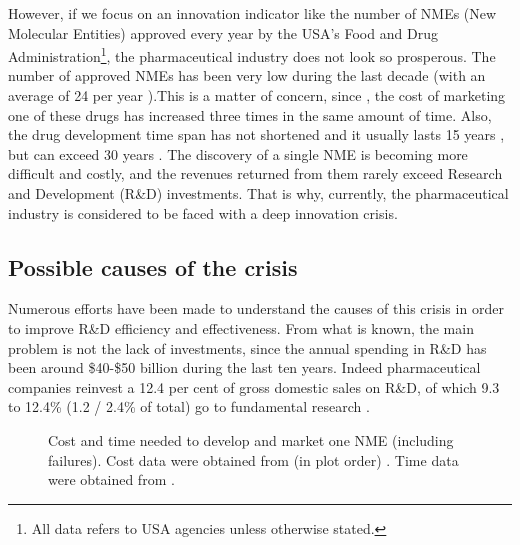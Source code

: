 However, if we focus on an innovation indicator like the number of NMEs (New Molecular Entities) approved every year by the USA's Food and Drug Administration\footnote{ All data refers to USA agencies unless otherwise stated.}, the pharmaceutical industry does not look so  prosperous. The number of approved NMEs has been very low during the last decade (with an average of 24 per year \cite{cder_2013_2014}).This is a matter of concern, since , the cost of marketing one of these drugs has increased three times in the same amount of time. Also, the drug development time span has not shortened and it usually lasts 15 years \cite{dimasi_price_2003}, but can exceed 30 years \cite{goozner_800_2004}. The discovery of a single NME is becoming more difficult and costly, and the revenues returned from them rarely exceed Research and Development (R\&D) investments. That is why, currently, the pharmaceutical industry is considered to be faced with a deep innovation crisis.

\subsection{Possible causes of the crisis}

	Numerous efforts have been made to understand the causes of this crisis in order to improve R\&D efficiency and effectiveness. From what is known, the main problem is not the lack of investments, since the annual spending in R\&D has been around \$40-\$50 billion \cite{phrma_2015_2015, paul_how_2010} during the last ten years. Indeed pharmaceutical companies reinvest a 12.4 per cent of gross domestic sales on R\&D, of which 9.3 to 12.4\% (1.2 / 2.4\% of total) go to fundamental research \cite{light_demythologizing_2011}.

\begin{figure}
\caption{Cost and time needed to develop and market one NME (including failures). Cost data were obtained from (in plot order) \cite{mestre-ferrandiz_rd_2012} \cite{phrma_2015_2015} \cite{dimasi_price_2003} \cite{tibco_transforming_????} \cite{peter_gwynne_pharmaceutical_????} \cite{tibco_transforming_????}  \cite{paul_how_2010} \cite{phrma_2011_2011} \cite{oconnor_football_????} \cite{dimasi_cost_2015} \cite{mullin_cost_????}. Time data were obtained from \cite{dreyfus_keeping_????} \cite{dreyfus_keeping_????} \cite{peter_gwynne_pharmaceutical_????} \cite{paul_how_2010}.}
\label{fig:drug_cost}
\end{figure}

